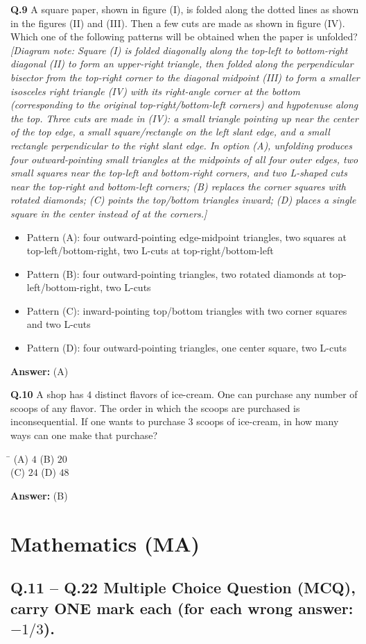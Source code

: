 \documentclass[11pt,a4paper]{article}
\newcommand{\optsfourA}[4]{%
  \begin{tabbing}
    \hspace{0.48\linewidth}\=\kill
    (A) #1 \> (B) #2 \\[2pt]
    (C) #3 \> (D) #4
  \end{tabbing}%
}
\newcommand{\optslistA}[4]{%
  \begin{itemize}
    \setlength{\itemsep}{2pt}\setlength{\parskip}{0pt}
    \item[(A)] #1
    \item[(B)] #2
    \item[(C)] #3
    \item[(D)] #4
  \end{itemize}%
}
\newcommand{\ans}[1]{\textbf{Answer:} #1\par\medskip}
\begin{document}
\textbf{Q.9} A square paper, shown in figure (I), is folded along the dotted lines as shown in the figures (II) and (III). Then a few cuts are made as shown in figure (IV). Which one of the following patterns will be obtained when the paper is unfolded?\\
\emph{[Diagram note: Square (I) is folded diagonally along the top-left to bottom-right diagonal (II) to form an upper-right triangle, then folded along the perpendicular bisector from the top-right corner to the diagonal midpoint (III) to form a smaller isosceles right triangle (IV) with its right-angle corner at the bottom (corresponding to the original top-right/bottom-left corners) and hypotenuse along the top. Three cuts are made in (IV): a small triangle pointing up near the center of the top edge, a small square/rectangle on the left slant edge, and a small rectangle perpendicular to the right slant edge. In option (A), unfolding produces four outward-pointing small triangles at the midpoints of all four outer edges, two small squares near the top-left and bottom-right corners, and two L-shaped cuts near the top-right and bottom-left corners; (B) replaces the corner squares with rotated diamonds; (C) points the top/bottom triangles inward; (D) places a single square in the center instead of at the corners.]}
\optslistA{Pattern (A): four outward-pointing edge-midpoint triangles, two squares at top-left/bottom-right, two L-cuts at top-right/bottom-left}{Pattern (B): four outward-pointing triangles, two rotated diamonds at top-left/bottom-right, two L-cuts}{Pattern (C): inward-pointing top/bottom triangles with two corner squares and two L-cuts}{Pattern (D): four outward-pointing triangles, one center square, two L-cuts}
\ans{(A)}

\textbf{Q.10} A shop has $4$ distinct flavors of ice-cream. One can purchase any number of scoops of any flavor. The order in which the scoops are purchased is inconsequential. If one wants to purchase $3$ scoops of ice-cream, in how many ways can one make that purchase?
\optsfourA{$4$}{$20$}{$24$}{$48$}
\ans{(B)}

\section*{Mathematics (MA)}

\subsection*{Q.11 -- Q.22 Multiple Choice Question (MCQ), carry ONE mark each (for each wrong answer: $-1/3$).}
\end{document}
